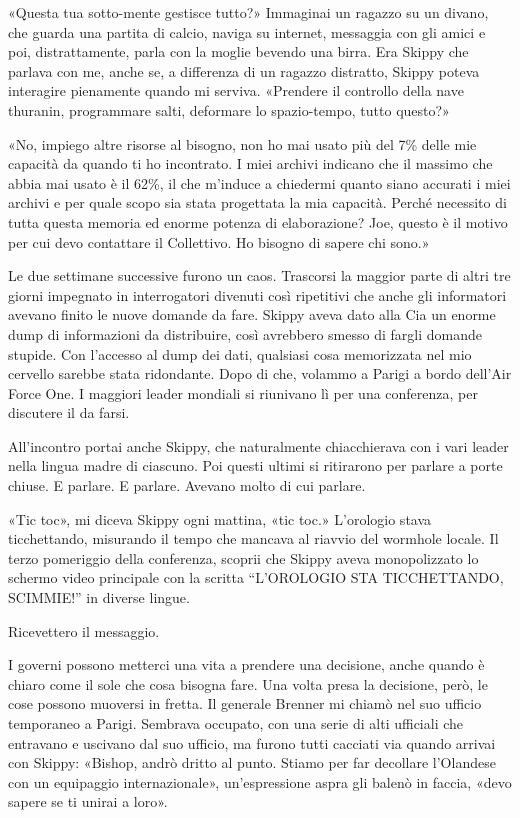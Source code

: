 «Questa tua sotto-mente gestisce tutto?» Immaginai un ragazzo su un
divano, che guarda una partita di calcio, naviga su internet, messaggia
con gli amici e poi, distrattamente, parla con la moglie bevendo una
birra. Era Skippy che parlava con me, anche se, a differenza di un
ragazzo distratto, Skippy poteva interagire pienamente quando mi
serviva. «Prendere il controllo della nave thuranin, programmare salti,
deformare lo spazio-tempo, tutto questo?»

«No, impiego altre risorse al bisogno, non ho mai usato più del 7\%
delle mie capacità da quando ti ho incontrato. I miei archivi indicano
che il massimo che abbia mai usato è il 62\%, il che m'induce a
chiedermi quanto siano accurati i miei archivi e per quale scopo sia
stata progettata la mia capacità. Perché necessito di tutta questa
memoria ed enorme potenza di elaborazione? Joe, questo è il motivo per
cui devo contattare il Collettivo. Ho bisogno di sapere chi sono.»

\hfill\break

Le due settimane successive furono un caos. Trascorsi la maggior parte
di altri tre giorni impegnato in interrogatori divenuti così ripetitivi
che anche gli informatori avevano finito le nuove domande da fare.
Skippy aveva dato alla Cia un enorme dump di informazioni da
distribuire, così avrebbero smesso di fargli domande stupide. Con
l'accesso al dump dei dati, qualsiasi cosa memorizzata nel mio cervello
sarebbe stata ridondante. Dopo di che, volammo a Parigi a bordo dell'Air
Force One. I maggiori leader mondiali si riunivano lì per una
conferenza, per discutere il da farsi.

All'incontro portai anche Skippy, che naturalmente chiacchierava con i
vari leader nella lingua madre di ciascuno. Poi questi ultimi si
ritirarono per parlare a porte chiuse. E parlare. E parlare. Avevano
molto di cui parlare.

«Tic toc», mi diceva Skippy ogni mattina, «tic toc.» L'orologio stava
ticchettando, misurando il tempo che mancava al riavvio del wormhole
locale. Il terzo pomeriggio della conferenza, scoprii che Skippy aveva
monopolizzato lo schermo video principale con la scritta ``L'OROLOGIO
STA TICCHETTANDO, SCIMMIE!'' in diverse lingue.

Ricevettero il messaggio.

\hfill\break

I governi possono metterci una vita a prendere una decisione, anche
quando è chiaro come il sole che cosa bisogna fare. Una volta presa la
decisione, però, le cose possono muoversi in fretta. Il generale Brenner
mi chiamò nel suo ufficio temporaneo a Parigi. Sembrava occupato, con
una serie di alti ufficiali che entravano e uscivano dal suo ufficio, ma
furono tutti cacciati via quando arrivai con Skippy: «Bishop, andrò
dritto al punto. Stiamo per far decollare l'Olandese con un equipaggio
internazionale», un'espressione aspra gli balenò in faccia, «devo sapere
se ti unirai a loro».

